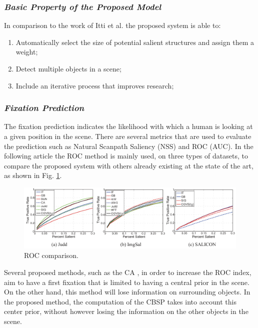 \subsubsection{\emph{Basic Property of the Proposed Model}}
In comparison to the work of Itti et al. \cite{0747815505} the proposed system is able to:
\begin{enumerate}
    \item Automatically select the size of potential salient structures and assign them a weight;
    \item Detect multiple objects in a scene;
    \item Include an iterative process that improves research;
\end{enumerate}

\subsubsection{\emph{Fixation Prediction}}
The fixation prediction indicates the likelihood with which a human is 
looking at a given position in the scene. There are several metrics that are 
used to evaluate the prediction such as Natural Scanpath Saliency (NSS) 
and ROC (AUC). In the following article the ROC method is mainly used, 
on three types of datasets, to compare the proposed system with others already 
existing at the state of the art, as shown in Fig. \ref{fig: ROC}.
\begin{figure}[htbp]
    \centering
    \includegraphics[width = 1 \linewidth]{images/paper1/ROC.png}
    \centering
    \caption{ROC comparison.}
    \label{fig: ROC}
\end{figure}

Several proposed methods, such as the CA \cite{0747815502}, in order to increase the ROC 
index, aim to have a first fixation that is limited to having a central prior 
in the scene. On the other hand, this method will lose information on surrounding 
objects. In the proposed method, the computation of the CBSP 
takes into account this center prior, without however losing the information 
on the other objects in the scene.

